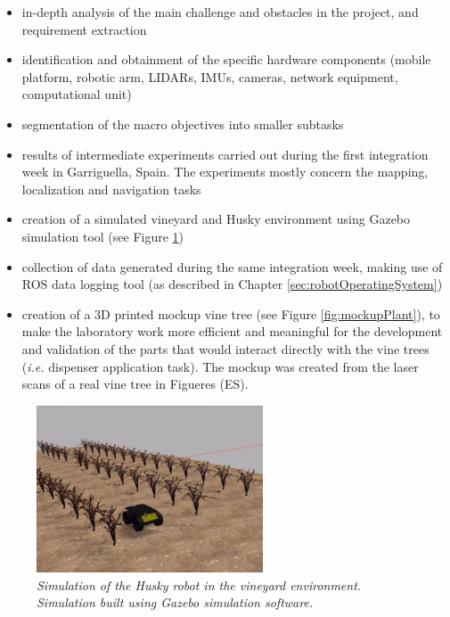 \begin{itemize}
	\item in-depth analysis of the main challenge and obstacles in the project, and requirement extraction
	\item identification and obtainment of the specific hardware components (mobile platform, robotic arm, \ac{LIDAR}s, \ac{IMU}s, cameras, network equipment, computational unit)
	\item segmentation of the macro objectives into smaller subtasks
	\item results of intermediate experiments carried out during the first integration week in Garriguella, Spain. The experiments mostly concern the mapping, localization and navigation tasks
	\item creation of a simulated vineyard and Husky environment using Gazebo simulation tool (see Figure \ref{fig:simulazioneGazebo})
	\item collection of data generated during the same integration week, making use of \ac{ROS} data logging tool (as described in Chapter \ref{sec:robotOperatingSystem})
	\item creation of a 3D printed mockup vine tree (see Figure \ref{fig:mockupPlant}), to make the laboratory work more efficient and meaningful for the development and validation of the parts that would interact directly with the vine trees (\textit{i.e.} dispenser application task). The mockup was created from the laser scans of a real vine tree in Figueres (ES).
\end{itemize}

\begin{figure}
	\centering
	\includegraphics[width=0.6\textwidth]{Images/grape_project/simulatedVine.png}
	\caption{\textit{Simulation of the Husky robot in the vineyard environment. Simulation built using Gazebo simulation software.}}
	\label{fig:simulazioneGazebo}
\end{figure}

